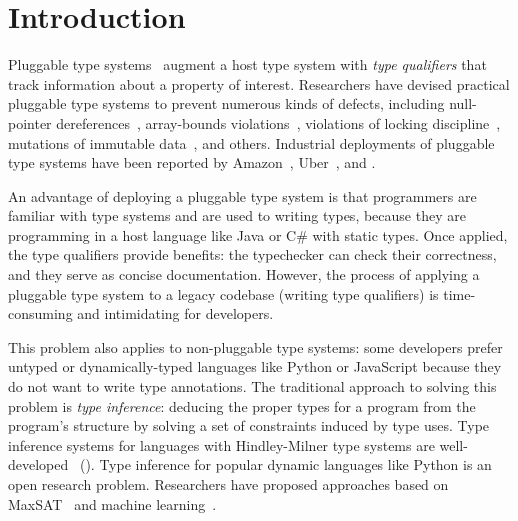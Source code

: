 \section{Introduction}
\label{sec:intro}


Pluggable type systems~\cite{FosterFFA99} augment a host type system
with \emph{type qualifiers} that track information about a property of
interest. Researchers have devised practical pluggable type systems
to prevent numerous kinds of defects, including null-pointer
dereferences~\cite{BanerjeeCS2019,PapiACPE2008,DietlDEMS2011},
array-bounds violations~\cite{KelloggDME2018},
violations of locking discipline~\cite{ErnstLMST2016},
mutations of immutable data~\cite{DietlDEMS2011,PapiACPE2008,coblenz2017glacier},
and others. Industrial deployments of pluggable type systems
have been reported by Amazon~\cite{KelloggSTE2020,KelloggRSSE2020},
Uber~\cite{BanerjeeCS2019}, and .

An advantage of deploying a pluggable type system is that programmers
are familiar with type systems and are used to writing types, because
they are programming in a host language like Java or C\# with static
types.
Once applied, the type qualifiers provide benefits: the typechecker can check
their correctness, and they serve as concise documentation.
However, the process of applying a pluggable type system to a legacy codebase
(\ie writing type qualifiers)
is time-consuming and intimidating for developers.

This problem also applies to non-pluggable type systems: some developers
prefer untyped or dynamically-typed languages like Python or JavaScript
because they do not want to write type annotations.
%
The traditional approach to solving this problem is \emph{type inference}:
deducing the proper types for a program from the program's structure
by solving a set of constraints induced by type uses.
%
Type inference systems for languages with Hindley-Milner type systems
are well-developed~\cite{DamasM1982} ().
%
Type inference for popular dynamic languages like Python is an open
research problem. Researchers have proposed approaches based
on MaxSAT~\cite{hassan2018maxsmt} and machine learning~\cite{xu2016python,peng2022static}.

